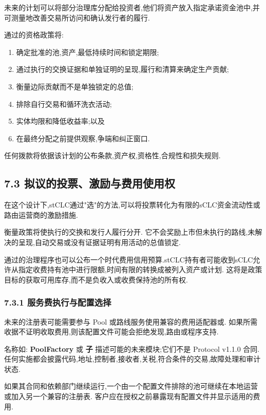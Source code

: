 \documentclass[11pt]{article}
\begin{document}
未来的计划可以将部分治理库分配给投资者,他们将资产放入指定承诺资金池中,并可测量地改善交易所访问和确认发行者的履行.

通过的资格政策将:

\begin{enumerate}[leftmargin=*]
\item 确定批准的池,资产,最低持续时间和锁定期限;
\item 通过执行的交换证据和单独证明的呈现,履行和清算来确定生产贡献;
\item 衡量边际贡献而不是单独锁定的总值;
\item 排除自行交易和循环洗衣活动;
\item 实体均限和降低收益率;以及
\item 在最终分配之前提供观察,争端和纠正窗口.
\end{enumerate}
任何拨款将依据该计划的公布条款,资产权,资格性,合规性和损失规则.

\subsection*{7.3 拟议的投票、激励与费用使用权}

在这个设计下,stCLC通过"选"的方法,可以将投票转化为有限的sCLC资金流动性或路由运营商的激励措施.

衡量政策将使执行的交换和发行人履行分开. 它不会奖励上市但未执行的路线,未解决的呈现,自动交易或没有证据证明有用活动的总值锁定.

通过的治理程序也可以公布一个时代费用信用预算.stCLC持有者可能收到sCLC允许从指定收费持有池中进行限额,时间有限的转换成被列入资产或计划. 这将是政策目标的获取可用库存,而不是负收入或收费保持池的所有权.

\subsubsection*{7.3.1 服务费执行与配置选择}

未来的注册表可能需要参与 Pool 或路线服务使用兼容的费用适配器或. 如果所需收据不证明收取费用,则该配置文件可能会拒绝发现,路由或程序支持.

名称如: \textbf{PoolFactory } 或 \textbf{ 子} 描述可能的未来模块;它们不是 Protocol v1.1.0 合同.任何实施都会披露代码,地址,控制者,接收者,关税,符合条件的交易,故障处理和审计状态.

如果其合同和依赖部门继续运行,一个由一个配置文件排除的池可继续在本地运营或加入另一个兼容的注册表. 客户应在授权之前暴露现有配置文件并显示适用的费用.
\end{document}
